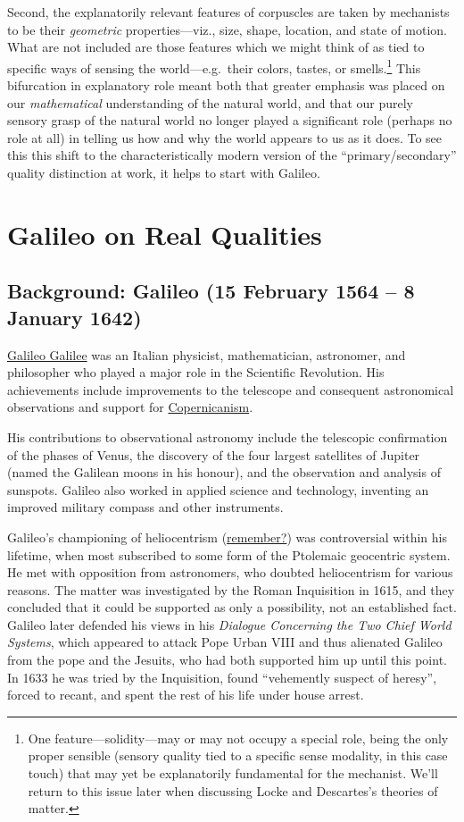 \documentclass[12pt]{article}
\begin{document}
Second, the explanatorily relevant features of corpuscles are taken by
mechanists to be their \emph{geometric} properties---viz., size, shape,
location, and state of motion. What are not included are those features
which we might think of as tied to specific ways of sensing the
world---e.g. their colors, tastes, or smells.\footnote{One feature---solidity---may or may not occupy a special role,
being the only proper sensible (sensory quality tied to a
specific sense modality, in this case touch) that may yet be
explanatorily fundamental for the mechanist. We'll return to this
issue later when discussing Locke and Descartes's theories of
matter.} This bifurcation in
explanatory role meant both that greater emphasis was placed on our
\emph{mathematical} understanding of the natural world, and that our purely
sensory grasp of the natural world no longer played a significant role
(perhaps no role at all) in telling us how and why the world appears to
us as it does. To see this this shift to the characteristically modern
version of the ``primary/secondary'' quality distinction at work, it helps
to start with Galileo.

\section{Galileo on Real Qualities}
\label{sec:org9689db8}
\subsection{Background: Galileo (15 February 1564 -- 8 January 1642)}
\label{sec:org8d603da}
\href{http://plato.stanford.edu/entries/galileo/}{Galileo Galilee} was an Italian physicist, mathematician, astronomer, and philosopher
who played a major role in the Scientific Revolution. His achievements include
improvements to the telescope and consequent astronomical observations and support
for \href{http://plato.stanford.edu/entries/copernicus/}{Copernicanism}.

His contributions to observational astronomy include the telescopic
confirmation of the phases of Venus, the discovery of the four largest
satellites of Jupiter (named the Galilean moons in his honour), and the
observation and analysis of sunspots. Galileo also worked in applied
science and technology, inventing an improved military compass and other
instruments.

Galileo's championing of heliocentrism (\href{http://bit.ly/1RvESfA}{remember?}) was controversial within his
lifetime, when most subscribed to some form of the Ptolemaic geocentric system. He
met with opposition from astronomers, who doubted heliocentrism for various reasons.
The matter was investigated by the Roman Inquisition in 1615, and they concluded that
it could be supported as only a possibility, not an established fact. Galileo later
defended his views in his \emph{Dialogue Concerning the Two Chief World Systems}, which
appeared to attack Pope Urban VIII and thus alienated Galileo from the pope and the
Jesuits, who had both supported him up until this point. In 1633 he was tried by the
Inquisition, found ``vehemently suspect of heresy'', forced to recant, and spent the
rest of his life under house arrest.
\end{document}
